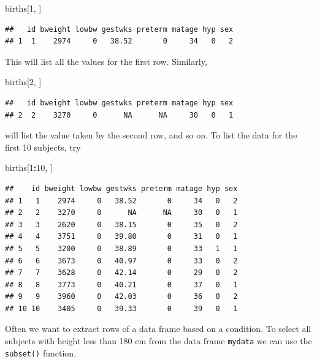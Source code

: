 \documentclass[
]{book}
\newenvironment{Shaded}{\begin{snugshade}}{\end{snugshade}}
\newcommand{\DecValTok}[1]{\textcolor[rgb]{0.00,0.00,0.81}{#1}}
\newcommand{\NormalTok}[1]{#1}
\newcommand{\SpecialCharTok}[1]{\textcolor[rgb]{0.81,0.36,0.00}{\textbf{#1}}}
\begin{document}
\begin{Shaded}
\begin{Highlighting}[]
\NormalTok{births[}\DecValTok{1}\NormalTok{, ]}
\end{Highlighting}
\end{Shaded}

\begin{verbatim}
##   id bweight lowbw gestwks preterm matage hyp sex
## 1  1    2974     0   38.52       0     34   0   2
\end{verbatim}

This will list all the values for the first row. Similarly,

\begin{Shaded}
\begin{Highlighting}[]
\NormalTok{births[}\DecValTok{2}\NormalTok{, ]}
\end{Highlighting}
\end{Shaded}

\begin{verbatim}
##   id bweight lowbw gestwks preterm matage hyp sex
## 2  2    3270     0      NA      NA     30   0   1
\end{verbatim}

will list the value taken by the second row, and so on.
To list the data for the first 10 subjects, try

\begin{Shaded}
\begin{Highlighting}[]
\NormalTok{births[}\DecValTok{1}\SpecialCharTok{:}\DecValTok{10}\NormalTok{, ]}
\end{Highlighting}
\end{Shaded}

\begin{verbatim}
##    id bweight lowbw gestwks preterm matage hyp sex
## 1   1    2974     0   38.52       0     34   0   2
## 2   2    3270     0      NA      NA     30   0   1
## 3   3    2620     0   38.15       0     35   0   2
## 4   4    3751     0   39.80       0     31   0   1
## 5   5    3200     0   38.89       0     33   1   1
## 6   6    3673     0   40.97       0     33   0   2
## 7   7    3628     0   42.14       0     29   0   2
## 8   8    3773     0   40.21       0     37   0   1
## 9   9    3960     0   42.03       0     36   0   2
## 10 10    3405     0   39.33       0     39   0   1
\end{verbatim}

Often we want to extract rows of a data frame based on a condition.
To select all subjects with height less than 180 cm from the
data frame \texttt{mydata} we can use the \texttt{subset()} function.
\end{document}
